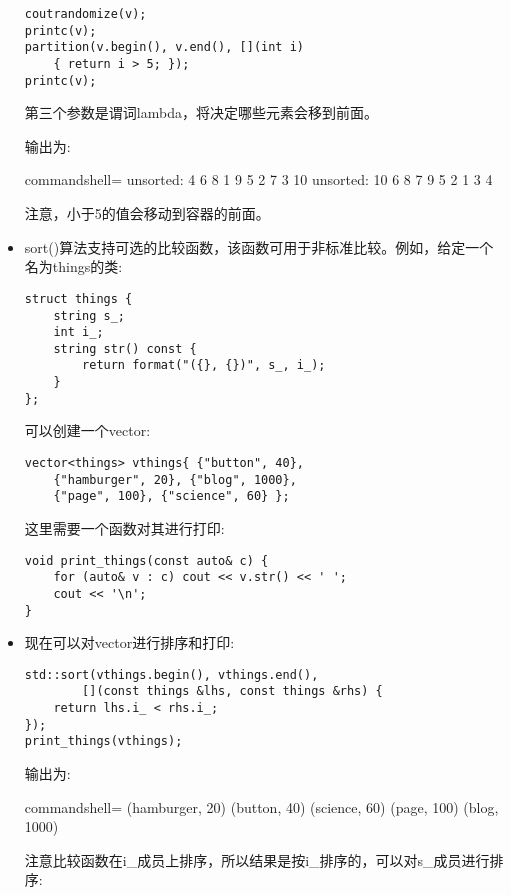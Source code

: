 \begin{itemize}
\begin{lstlisting}[style=styleCXX]
coutrandomize(v);
printc(v);
partition(v.begin(), v.end(), [](int i)
	{ return i > 5; });
printc(v);
\end{lstlisting}

第三个参数是谓词lambda，将决定哪些元素会移到前面。

输出为:

\begin{tcblisting}{commandshell={}}
unsorted: 4 6 8 1 9 5 2 7 3 10
unsorted: 10 6 8 7 9 5 2 1 3 4
\end{tcblisting}

注意，小于5的值会移动到容器的前面。

\item 
sort()算法支持可选的比较函数，该函数可用于非标准比较。例如，给定一个名为things的类:

\begin{lstlisting}[style=styleCXX]
struct things {
	string s_;
	int i_;
	string str() const {
		return format("({}, {})", s_, i_);
	}
};
\end{lstlisting}

可以创建一个vector:

\begin{lstlisting}[style=styleCXX]
vector<things> vthings{ {"button", 40},
	{"hamburger", 20}, {"blog", 1000},
	{"page", 100}, {"science", 60} };
\end{lstlisting}

这里需要一个函数对其进行打印:

\begin{lstlisting}[style=styleCXX]
void print_things(const auto& c) {
	for (auto& v : c) cout << v.str() << ' ';
	cout << '\n';
}
\end{lstlisting}

\item 
现在可以对vector进行排序和打印:

\begin{lstlisting}[style=styleCXX]
std::sort(vthings.begin(), vthings.end(),
		[](const things &lhs, const things &rhs) {
	return lhs.i_ < rhs.i_;
});
print_things(vthings);
\end{lstlisting}

输出为:

\begin{tcblisting}{commandshell={}}
(hamburger, 20) (button, 40) (science, 60) (page, 100)
(blog, 1000)
\end{tcblisting}

注意比较函数在i\_成员上排序，所以结果是按i\_排序的，可以对s\_成员进行排序:


\end{itemize}
